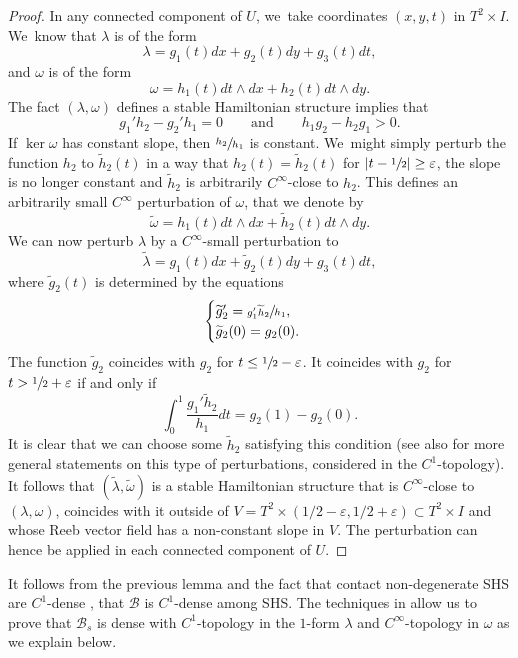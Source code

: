 \begin{proof}
In any connected component of $U$, we~take coordinates $(x,y,t)$ in $T^2\times I$. We~know that $\lambda$ is of the form
\[
\lambda= g_1(t) dx + g_2(t) dy + g_3(t)dt,
\]
and $\omega$ is of the form
\[
\omega= h_1(t)dt\wedge dx + h_2(t)dt\wedge dy.
\]
The fact $(\lambda,\omega)$ defines a stable Hamiltonian structure implies that
\[
g_1'h_2-g_2'h_1=0 \qquad \mbox{and} \qquad h_1g_2-h_2g_1>0.
\]
If $\ker \omega$ has constant slope, then $\sfrac{h_2}{h_1}$ is constant. We~might simply perturb the function $h_2$ to $\widetilde h_2(t)$ in a way that $h_2(t)=\widetilde h_2(t)$ for $|t-\sfrac{1}{2}|\geq \varepsilon$, the slope is no longer constant and $\widetilde h_2$ is arbitrarily $C^\infty$-close to $h_2$. This defines an arbitrarily small $C^\infty$ perturbation of $\omega$, that we denote by
\[
\widetilde \omega= h_1(t) dt\wedge dx + \widetilde h_2(t) dt\wedge dy.
\]
We can now perturb $\lambda$ by a $C^\infty$-small perturbation to
\[
\widetilde \lambda= g_1(t)dx+ \widetilde g_2(t)dy+g_3(t)dt,
\]
where $\widetilde g_2(t)$ is determined by the equations
\begin{equation*}
\begin{cases}
\widetilde g_2'=\sfrac{g_1'\widetilde h_2}{h_1},\\
\widetilde g_2(0)=g_2(0).
\end{cases}
\end{equation*}
The function $\widetilde g_2$ coincides with $g_2$ for $t\leq \sfrac{1}{2}-\varepsilon$. It coincides with $g_2$ for $t > \sfrac{1}{2}+\varepsilon$ if and only if
\[
\int_0^1 \frac{g_1'\widetilde h_2}{h_1}dt=g_2(1)-g_2(0).
\]
It is clear that we can choose some $\widetilde h_2$ satisfying this condition (see also \cite[Lem.\,3.15]{CV1} for more general statements on this type of perturbations, considered in the $C^1$\nobreakdash-topo\-logy). It follows that $(\widetilde \lambda,\widetilde \omega)$ is a stable Hamiltonian structure that is $C^\infty$-close to $(\lambda,\omega)$, coincides with it outside of $V=T^2\times(1/2-\varepsilon,1/2+\varepsilon)\subset T^2\times I$ and whose Reeb vector field has a non-constant slope in $V$. The perturbation can hence be applied in each connected component of $U$.
\end{proof}

It follows from the previous lemma and the fact that contact non-degenerate SHS are $C^1$-dense \cite[Th.\,4.6]{CV1}, that $\mathcal{B}$ is $C^1$-dense among SHS. The techniques in \cite[Th.\,4.6]{CV1} allow us to prove that $\mathcal{B}_s$ is dense with $C^1$-topology in the $1$-form $\lambda$ and $C^\infty$-topology in $\omega$ as we explain below.

